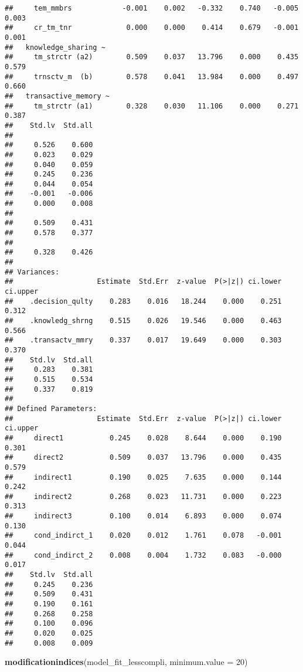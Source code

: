 \documentclass[]{article}
\newenvironment{Shaded}{\begin{snugshade}}{\end{snugshade}}
\newcommand{\DataTypeTok}[1]{\textcolor[rgb]{0.13,0.29,0.53}{#1}}
\newcommand{\DecValTok}[1]{\textcolor[rgb]{0.00,0.00,0.81}{#1}}
\newcommand{\KeywordTok}[1]{\textcolor[rgb]{0.13,0.29,0.53}{\textbf{#1}}}
\newcommand{\NormalTok}[1]{#1}
\begin{document}
\begin{verbatim}
##     tem_mmbrs            -0.001    0.002   -0.332    0.740   -0.005    0.003
##     cr_tm_tnr             0.000    0.000    0.414    0.679   -0.001    0.001
##   knowledge_sharing ~                                                       
##     tm_strctr (a2)        0.509    0.037   13.796    0.000    0.435    0.579
##     trnsctv_m  (b)        0.578    0.041   13.984    0.000    0.497    0.660
##   transactive_memory ~                                                      
##     tm_strctr (a1)        0.328    0.030   11.106    0.000    0.271    0.387
##    Std.lv  Std.all
##                   
##     0.526    0.600
##     0.023    0.029
##     0.040    0.059
##     0.245    0.236
##     0.044    0.054
##    -0.001   -0.006
##     0.000    0.008
##                   
##     0.509    0.431
##     0.578    0.377
##                   
##     0.328    0.426
## 
## Variances:
##                    Estimate  Std.Err  z-value  P(>|z|) ci.lower ci.upper
##    .decision_qulty    0.283    0.016   18.244    0.000    0.251    0.312
##    .knowledg_shrng    0.515    0.026   19.546    0.000    0.463    0.566
##    .transactv_mmry    0.337    0.017   19.649    0.000    0.303    0.370
##    Std.lv  Std.all
##     0.283    0.381
##     0.515    0.534
##     0.337    0.819
## 
## Defined Parameters:
##                    Estimate  Std.Err  z-value  P(>|z|) ci.lower ci.upper
##     direct1           0.245    0.028    8.644    0.000    0.190    0.301
##     direct2           0.509    0.037   13.796    0.000    0.435    0.579
##     indirect1         0.190    0.025    7.635    0.000    0.144    0.242
##     indirect2         0.268    0.023   11.731    0.000    0.223    0.313
##     indirect3         0.100    0.014    6.893    0.000    0.074    0.130
##     cond_indirct_1    0.020    0.012    1.761    0.078   -0.001    0.044
##     cond_indirct_2    0.008    0.004    1.732    0.083   -0.000    0.017
##    Std.lv  Std.all
##     0.245    0.236
##     0.509    0.431
##     0.190    0.161
##     0.268    0.258
##     0.100    0.096
##     0.020    0.025
##     0.008    0.009
\end{verbatim}

\begin{Shaded}
\begin{Highlighting}[]
\KeywordTok{modificationindices}\NormalTok{(model_fit_lesscompli, }\DataTypeTok{minimum.value =} \DecValTok{20}\NormalTok{)}
\end{Highlighting}
\end{Shaded}
\end{document}
